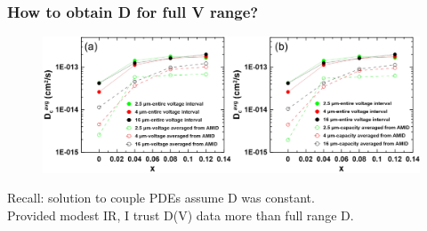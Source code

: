 \documentclass{beamer}
\begin{document}
\begin{frame}
\frametitle{How to obtain D for full V range?}

\begin{figure}
	\includegraphics[width=0.95\linewidth]{figs/avgD.png}
\end{figure}

Recall: solution to couple PDEs assume D was constant. \\
Provided modest IR, I trust D(V) data more than full range D.

\end{frame}
\end{document}
